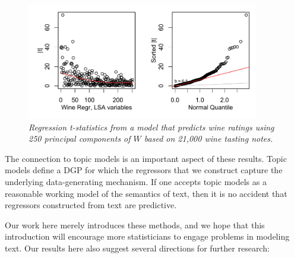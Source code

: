 \documentclass[12pt]{article}
\begin{document}
 
 \begin{figure}
 \caption{ \label{fig:wine} \sl Regression t-statistics from a model that predicts wine ratings using 250 principal components of $W$ based on 21,000 wine tasting notes.}
 
 \centerline{
   \includegraphics[width=4in]{figures/wine.pdf}
   }
  \end{figure} 
  
  
   The connection to topic models is an important aspect of these results.  Topic models define a DGP for which the regressors that we construct capture the underlying data-generating mechanism.  If one accepts topic models as a reasonable working model of the semantics of text, then it is no accident that regressors constructed from text are predictive.


 Our work here merely introduces these methods, and we hope that this introduction will encourage more statisticians to engage problems in  modeling text.  Our results here also suggest several directions for further research:
\end{document}
